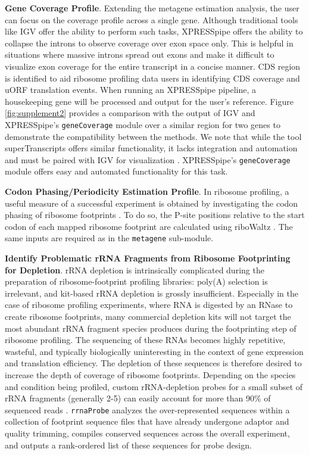 \documentclass[10pt, oneside]{article}
\begin{document}
\noindent\textbf{Gene Coverage Profile}. Extending the metagene estimation analysis, the user can focus on the coverage profile across a single gene. Although traditional tools like IGV \cite{igv} offer the ability to perform such tasks, XPRESSpipe offers the ability to collapse the introns to observe coverage over exon space only. This is helpful in situations where massive introns spread out exons and make it difficult to visualize exon coverage for the entire transcript in a concise manner. CDS region is identified to aid ribosome profiling data users in identifying CDS coverage and uORF translation events. When running an XPRESSpipe pipeline, a housekeeping gene will be processed and output for the user's reference. Figure \ref{fig:supplement2} provides a comparison with the output of IGV \cite{igv} and XPRESSpipe's \texttt{geneCoverage} module over a similar region for two genes to demonstrate the compatibility between the methods. We note that while the tool superTranscripts offers similar functionality, it lacks integration and automation and must be paired with IGV for visualization \cite{supertranscripts}. XPRESSpipe's \texttt{geneCoverage} module offers easy and automated functionality for this task.\par

\noindent\textbf{Codon Phasing/Periodicity Estimation Profile}. In ribosome profiling, a useful measure of a successful experiment is obtained by investigating the codon phasing of ribosome footprints \cite{ingolia_meth}. To do so, the P-site positions relative to the start codon of each mapped ribosome footprint are calculated using riboWaltz \cite{ribowaltz}. The same inputs are required as in the \texttt{metagene} sub-module.\par

\noindent\textbf{Identify Problematic rRNA Fragments from Ribosome Footprinting for Depletion}. rRNA depletion is intrinsically complicated during the preparation of ribosome-footprint profiling libraries: poly(A) selection is irrelevant, and kit-based rRNA depletion is grossly insufficient. Especially in the case of ribosome profiling experiments, where RNA is digested by an RNase to create ribosome footprints, many commercial depletion kits will not target the most abundant rRNA fragment species produces during the footprinting step of ribosome profiling. The sequencing of these RNAs becomes highly repetitive, wasteful, and typically biologically uninteresting in the context of gene expression and translation efficiency. The depletion of these sequences is therefore desired to increase the depth of coverage of ribosome footprints. Depending on the species and condition being profiled, custom rRNA-depletion probes for a small subset of rRNA fragments (generally 2-5) can easily account for more than 90\% of sequenced reads \cite{ingolia_meth, ingolia_science}. \texttt{rrnaProbe} analyzes the over-represented sequences within a collection of footprint sequence files that have already undergone adaptor and quality trimming, compiles conserved sequences across the overall experiment, and outputs a rank-ordered list of these sequences for probe design.\\
\end{document}

